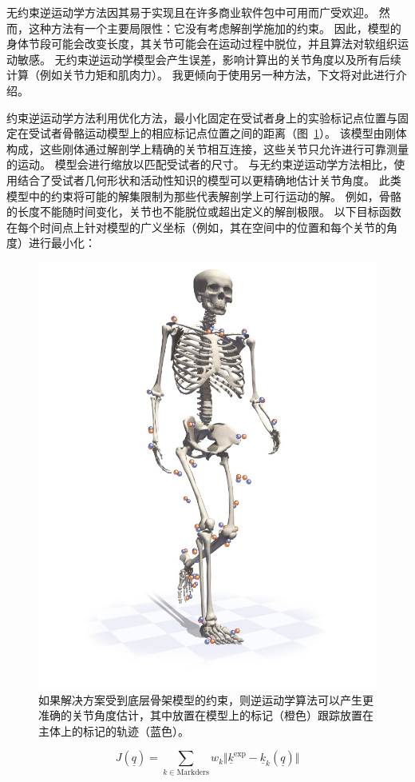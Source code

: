 无约束逆运动学方法因其易于实现且在许多商业软件包中可用而广受欢迎。
然而，这种方法有一个主要局限性：它没有考虑解剖学施加的约束。
因此，模型的身体节段可能会改变长度，其关节可能会在运动过程中脱位，并且算法对软组织运动敏感。
无约束逆运动学模型会产生误差，影响计算出的关节角度以及所有后续计算（例如关节力矩和肌肉力）。
我更倾向于使用另一种方法，下文将对此进行介绍。




约束逆运动学方法利用优化方法，最小化固定在受试者身上的实验标记点位置与固定在受试者骨骼运动模型上的相应标记点位置之间的距离（图~\ref{fig:7_14}）。
该模型由刚体构成，这些刚体通过解剖学上精确的关节相互连接，这些关节只允许进行可靠测量的运动。
模型会进行缩放以匹配受试者的尺寸。
与无约束逆运动学方法相比，使用结合了受试者几何形状和活动性知识的模型可以更精确地估计关节角度。
此类模型中的约束将可能的解集限制为那些代表解剖学上可行运动的解。
例如，骨骼的长度不能随时间变化，关节也不能脱位或超出定义的解剖极限。
以下目标函数在每个时间点上针对模型的广义坐标（例如，其在空间中的位置和每个关节的角度）进行最小化：


\begin{figure}[!htb]
	\centering
	\includegraphics[width=0.9\linewidth]{chap7/7_14}
	\caption{如果解决方案受到底层骨架模型的约束，则逆运动学算法可以产生更准确的关节角度估计，其中放置在模型上的标记（橙色）跟踪放置在主体上的标记的轨迹（蓝色）。 \label{fig:7_14}}
\end{figure}


\begin{equation}
	J(\underline{q}) = 
		\sum_{k \in \text{Markders}} 
		w_k
		\Vert \underline{k}^\text{exp} - \underline{k}_k (\underline{q}) \Vert
	\label{eq:7_16}
\end{equation}













